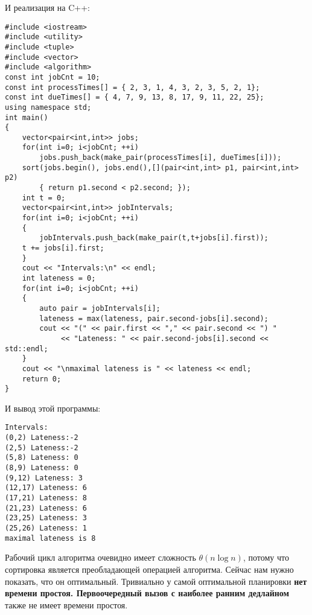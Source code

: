 \vspace{\baselineskip}
И реализация на C++:

\vspace{\baselineskip}
\begin{tcolorbox}
\begin{verbatim}
#include <iostream>
#include <utility>
#include <tuple>
#include <vector>
#include <algorithm>
const int jobCnt = 10;
const int processTimes[] = { 2, 3, 1, 4, 3, 2, 3, 5, 2, 1};
const int dueTimes[] = { 4, 7, 9, 13, 8, 17, 9, 11, 22, 25};
using namespace std;
int main()
{
    vector<pair<int,int>> jobs;
    for(int i=0; i<jobCnt; ++i)
        jobs.push_back(make_pair(processTimes[i], dueTimes[i]));
    sort(jobs.begin(), jobs.end(),[](pair<int,int> p1, pair<int,int> p2)
        { return p1.second < p2.second; });
    int t = 0;
    vector<pair<int,int>> jobIntervals;
    for(int i=0; i<jobCnt; ++i)
    {
        jobIntervals.push_back(make_pair(t,t+jobs[i].first));
    t += jobs[i].first;
    }
    cout << "Intervals:\n" << endl;
    int lateness = 0;
    for(int i=0; i<jobCnt; ++i)
    {
        auto pair = jobIntervals[i];
        lateness = max(lateness, pair.second-jobs[i].second);
        cout << "(" << pair.first << "," << pair.second << ") "
             << "Lateness: " << pair.second-jobs[i].second << std::endl;
    }
    cout << "\nmaximal lateness is " << lateness << endl;
    return 0;
}
\end{verbatim}
\end{tcolorbox}

\vspace{\baselineskip}
И вывод этой программы:

\vspace{\baselineskip}
\begin{tcolorbox}
\begin{verbatim}
Intervals:
(0,2) Lateness:-2
(2,5) Lateness:-2
(5,8) Lateness: 0
(8,9) Lateness: 0
(9,12) Lateness: 3
(12,17) Lateness: 6
(17,21) Lateness: 8
(21,23) Lateness: 6
(23,25) Lateness: 3
(25,26) Lateness: 1
maximal lateness is 8
\end{verbatim}
\end{tcolorbox}

\vspace{\baselineskip}
Рабочий цикл алгоритма очевидно имеет сложность $\theta(n \log n)$, потому что сортировка является преобладающей операцией алгоритма. Сейчас нам нужно показать, что он оптимальный. Тривиально у самой оптимальной планировки \textbf{нет времени простоя. Первоочередный вызов с наиболее ранним дедлайном} также не имеет времени простоя.

